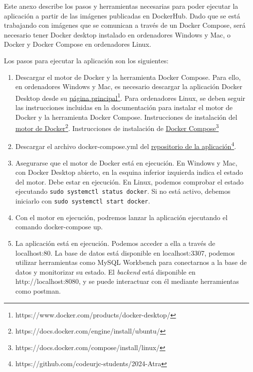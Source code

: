 Este anexo describe los pasos y herramientas necesarias para poder ejecutar la aplicación a partir de las imágenes publicadas en DockerHub. Dado que se está trabajando con imágenes que se comunican a través de un Docker Compose, será necesario tener Docker desktop instalado en ordenadores Windows y Mac, o Docker y Docker Compose en ordenadores Linux. 

Los pasos para ejecutar la aplicación son los siguientes:
\begin{enumerate}
    \item Descargar el motor de Docker y la herramienta Docker Compose. Para ello, en ordenadores Windows y Mac, es necesario descargar la aplicación Docker Desktop desde su \href{https://www.docker.com/products/docker-desktop/}{\uline{página principal}\footnote{\url{https://www.docker.com/products/docker-desktop/}}}. Para ordenadores Linux, se deben seguir las instrucciones incluidas en la documentación para instalar el motor de Docker y la herramienta Docker Compose. Instrucciones de instalación del \href{https://docs.docker.com/engine/install/ubuntu/}{\uline{motor de Docker}\footnote{\url{https://docs.docker.com/engine/install/ubuntu/}}}. Instrucciones de instalación de \href{https://docs.docker.com/compose/install/linux/}{\uline{Docker Compose}\footnote{\url{https://docs.docker.com/compose/install/linux/}}}
    \item Descargar el archivo docker-compose.yml del \href{https://github.com/codeurjc-students/2024-Atra}{\uline{repositorio de la aplicación}\footnote{\url{https://github.com/codeurjc-students/2024-Atra}}}.
    \item Asegurarse que el motor de Docker está en ejecución. En Windows y Mac, con Docker Desktop abierto, en la esquina inferior izquierda indica el estado del motor. Debe estar en ejecución. En Linux, podemos comprobar el estado ejecutando \texttt{sudo systemctl status docker}. Si no está activo, debemos iniciarlo con \texttt{sudo systemctl start docker}.
    \item Con el motor en ejecución, podremos lanzar la aplicación ejecutando el comando docker-compose up.
    \item La aplicación está en ejecución. Podemos acceder a ella a través de localhost:80. La base de datos está disponible en localhost:3307, podemos utilizar herramientas como MySQL Workbench para conectarnos a la base de datos y monitorizar su estado. El \textit{backend} está disponible en http://localhost:8080, y se puede interactuar con él mediante herramientas como postman.
\end{enumerate}

